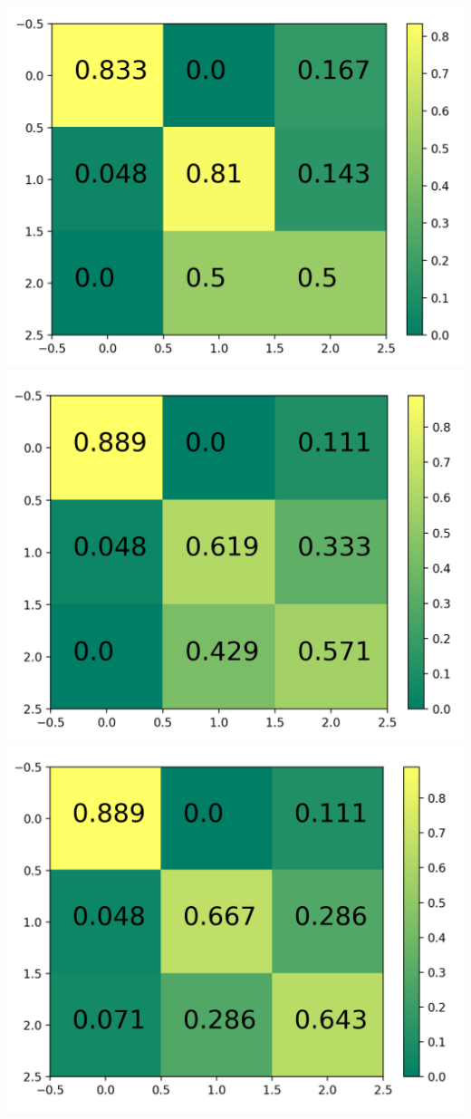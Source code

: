 \documentclass[11pt]{article}
\begin{document}
\includegraphics[scale=0.3]{Confusion_matrix(k=4)}
\includegraphics[scale=0.3]{Confusion_matrix(k=5)}
\includegraphics[scale=0.3]{Confusion_matrix(k=7)}
\end{document}
